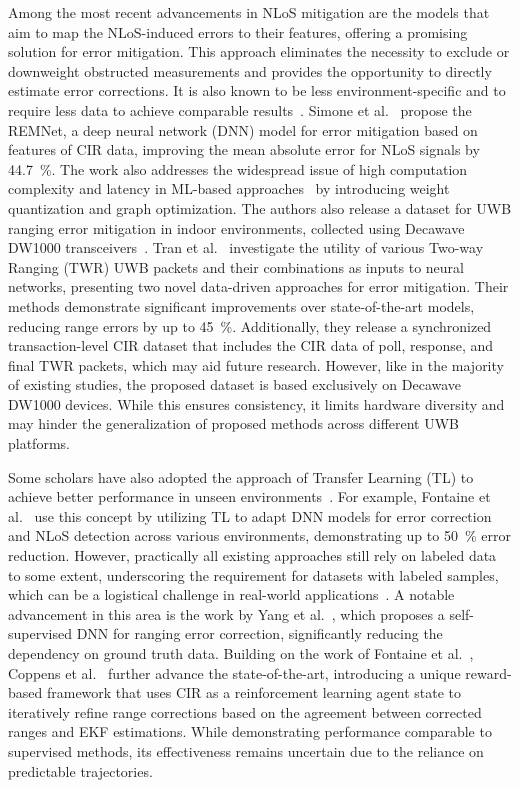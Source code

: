 Among the most recent advancements in NLoS mitigation are the models that aim to map the NLoS-induced errors to their features, offering a promising solution for error mitigation. This approach eliminates the necessity to exclude or downweight obstructed measurements and provides the opportunity to directly estimate error corrections. It is also known to be less environment-specific and to require less data to achieve comparable results~\cite{savic2015kernel, Simone2021UWB, Kim2023NLOS}. Simone et al.~\cite{Simone2021UWB} propose the REMNet, a deep neural network (DNN) model for error mitigation based on features of CIR data, improving the mean absolute error for NLoS signals by \SI{44.7}{\percent}. The work also addresses the widespread issue of high computation complexity and latency in ML-based approaches~\cite{Zeng2018NLOS} by introducing weight quantization and graph optimization. The authors also release a dataset for UWB ranging error mitigation in indoor environments, collected using Decawave DW1000 transceivers~\cite{simone_angarano_2020_4399187}. Tran et al.~\cite{Tran2022UWB} investigate the utility of various Two-way Ranging (TWR) UWB packets and their combinations as inputs to neural networks, presenting two novel data-driven approaches for error mitigation. Their methods demonstrate significant improvements over state-of-the-art models, reducing range errors by up to \SI{45}{\percent}. Additionally, they release a synchronized transaction-level CIR dataset that includes the CIR data of poll, response, and final TWR packets, which may aid future research. However, like in the majority of existing studies, the proposed dataset is based exclusively on Decawave DW1000 devices. While this ensures consistency, it limits hardware diversity and may hinder the generalization of proposed methods across different UWB platforms.

Some scholars have also adopted the approach of Transfer Learning (TL) to achieve better performance in unseen environments~\cite{fontaine2023transfer, li2023unsupervised}. For example, Fontaine et al.~\cite{fontaine2023transfer} use this concept by utilizing TL to adapt DNN models for error correction and NLoS detection across various environments, demonstrating up to \SI{50}{\percent} error reduction. However, practically all existing approaches still rely on labeled data to some extent, underscoring the requirement for datasets with labeled samples, which can be a logistical challenge in real-world applications~\cite{coppens2024removing}. A notable advancement in this area is the work by Yang et al.~\cite{yang2023self}, which proposes a self-supervised DNN for ranging error correction, significantly reducing the dependency on ground truth data. Building on the work of Fontaine et al.~\cite{fontaine2023transfer}, Coppens et al.~\cite{coppens2024removing} further advance the state-of-the-art, introducing a unique reward-based framework that uses CIR as a reinforcement learning agent state to iteratively refine range corrections based on the agreement between corrected ranges and EKF estimations. While demonstrating performance comparable to supervised methods, its effectiveness remains uncertain due to the reliance on predictable trajectories.

